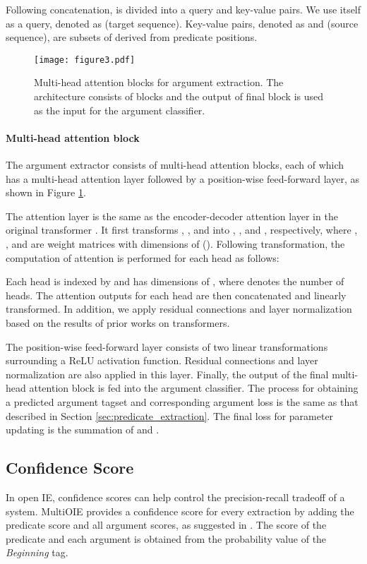 \documentclass[11pt,a4paper]{article}
\begin{document}
Following concatenation,  is divided into a query and key-value pairs.
We use  itself as a query, denoted as  (target sequence).
Key-value pairs, denoted as  and  (source sequence), are subsets of  derived from predicate positions.

\begin{figure}[t]
\centering
\texttt{[image: figure3.pdf]}
\caption
{
Multi-head attention blocks for argument extraction.
The architecture consists of  blocks and the output of final block  is used as the input for the argument classifier.
}
\label{fig:3}
\end{figure}

\paragraph{Multi-head attention block}
The argument extractor consists of  multi-head attention blocks, each of which has a multi-head attention layer followed by a position-wise feed-forward layer, as shown in Figure \ref{fig:3}.

The attention layer is the same as the encoder-decoder attention layer in the original transformer \citep{10.5555/3295222.3295349}.
It first transforms , , and  into , , and , respectively, where , , and  are weight matrices with dimensions of ().
Following transformation, the computation of attention is performed for each head as follows:

Each head is indexed by  and has dimensions of , where  denotes the number of heads.
The attention outputs for each head are then concatenated and linearly transformed.
In addition, we apply residual connections \citep{He2016DeepRL} and layer normalization \citep{Ba2016LayerN} based on the results of prior works on transformers.

The position-wise feed-forward layer consists of two linear transformations surrounding a ReLU activation function.
Residual connections and layer normalization are also applied in this layer.
Finally, the output of the final multi-head attention block is fed into the argument classifier.
The process for obtaining a predicted argument tagset  and corresponding argument loss  is the same as that described in Section \ref{sec:predicate_extraction}.
The final loss for parameter updating is the summation of  and .

\subsection{Confidence Score}
\label{sec:confidence_score}
In open IE, confidence scores can help control the precision-recall tradeoff of a system.
MultiOIE provides a confidence score for every extraction by adding the predicate score and all argument scores, as suggested in \citet{Zhan2019SpanMF}.
The score of the predicate and each argument is obtained from the probability value of the \emph{Beginning} tag.
\end{document}
